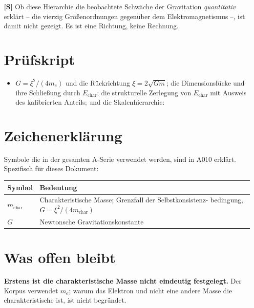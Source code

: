\textbf{[S]} Ob diese Hierarchie die beobachtete Schwäche der Gravitation
\emph{quantitativ} erklärt -- die vierzig Größenordnungen gegenüber dem
Elektromagnetismus --, ist damit nicht gezeigt. Es ist eine Richtung, keine
Rechnung.

\section{Prüfskript}

\begin{itemize}
  \item $G=\xi^2/(4m_e)$ und die Rückrichtung $\xi=2\sqrt{Gm}$; die
    Dimensionslücke und ihre Schließung durch $E_\text{char}$; die
    strukturelle Zerlegung von $E_\text{char}$ mit Ausweis des kalibrierten
    Anteils; und die Skalenhierarchie:
\end{itemize}


\section{Zeichenerklärung}

Symbole die in der gesamten A-Serie verwendet werden, sind in A010 erklärt.
Spezifisch für dieses Dokument:

\begin{center}
\renewcommand{\arraystretch}{1.3}
{\small\begin{tabular}{lp{9cm}}
\toprule
Symbol & Bedeutung \\
\midrule
$m_\text{char}$ & Charakteristische Masse; Grenzfall der Selbstkonsistenz-
  bedingung, $G = \xi^2/(4m_\text{char})$ \\
$G$ & Newtonsche Gravitationskonstante \\
\bottomrule
\end{tabular}}
\renewcommand{\arraystretch}{1.0}
\end{center}

\section{Was offen bleibt}

\textbf{Erstens ist die charakteristische Masse nicht eindeutig festgelegt.} Der
Korpus verwendet $m_e$; warum das Elektron und nicht eine andere Masse die
charakteristische ist, ist nicht begründet.

